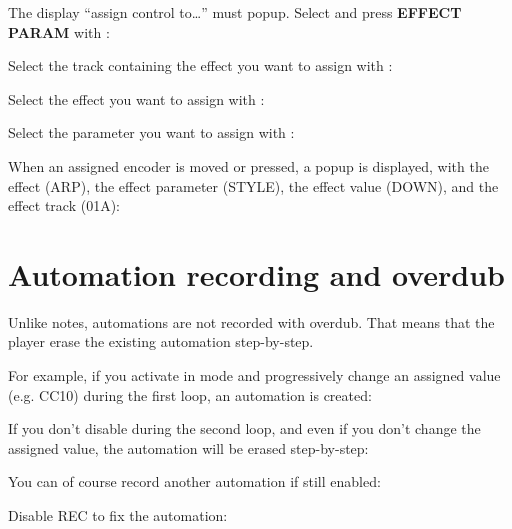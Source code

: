 The display ``assign control to\ldots'' must popup. Select and press \textbf{EFFECT PARAM} with \encodericon{}:


Select the track containing the effect you want to assign with \encodericon{}:


Select the effect you want to assign with \encodericon{}:


Select the parameter you want to assign with \encodericon{}:



When an assigned encoder is moved or pressed, a popup is displayed, with the effect (ARP), the effect parameter (STYLE), the effect value (DOWN), and the effect track (01A):


\section{Automation recording and overdub}

Unlike notes, automations are not recorded with overdub. That means that the player erase the existing automation step-by-step.

For example, if you activate  in  mode and progressively change an assigned value (e.g. CC10) during the first loop, an automation is created:


If you don't disable  during the second loop, and even if you don't change the assigned value, the automation will be erased step-by-step:


You can of course record another automation if  still enabled:


Disable REC  to fix the automation:


